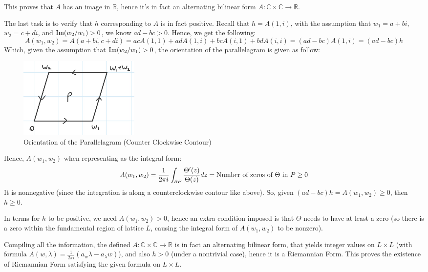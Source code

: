 \documentclass{article}
\begin{document}
\begin{itemize}
    This proves that $A$ has an image in $\mathbb{R}$, hence it's in fact an alternating bilinear form $A:\mathbb{C}\times\mathbb{C}\rightarrow\mathbb{R}$.

    \hfil

    The last task is to verify that $h$ corresponding to $A$ is in fact positive. Recall that $h=A(1,i)$, with the assumption that $w_1=a+bi$, $w_2=c+di$, and $\textmd{Im}(w_2/w_1)>0$, we know $ad-bc > 0$. Hence, we get the following:
    $$A(w_1,w_2) =A(a+bi,c+di) = acA(1,1)+adA(1,i)+bcA(i,1)+bdA(i,i) = (ad-bc)A(1,i) = (ad-bc)h$$
    Which, given the assumption that $\textmd{Im}(w_2/w_1)>0$, the orientation of the parallelagram is given as follow:

    \begin{figure}[h!]
        \begin{center}
            \includegraphics*[width=60mm]{q2 orient 2.jpg}
            \caption{Orientation of the Parallelagram (Counter Clockwise Contour)}
        \end{center}
    \end{figure}

    Hence, $A(w_1,w_2)$ when representing as the integral form:
    $$A(w_1,w_2)=\frac{1}{2\pi i}\int_{\partial P}\frac{\Theta'(z)}{\Theta(z)}dz = \textmd{Number of zeros of }\Theta \textmd{ in } P \geq 0$$
    It is nonnegative (since the integration is along a counterclockwise contour like above). So, given $(ad-bc)h = A(w_1,w_2)\geq 0$, then $h \geq 0$.

    In terms for $h$ to be positive, we need $A(w_1,w_2)>0$, hence an extra condition imposed is that $\Theta$ needs to have at least a zero (so there is a zero within the fundamental region of lattice $L$, causing the integral form of $A(w_1,w_2)$ to be nonzero).

    \hfil

    Compiling all the information, the defined $A:\mathbb{C}\times \mathbb{C}\rightarrow\mathbb{R}$ is in fact an alternating bilinear form, that yields integer values on $L\times L$ (with formula $A(w,\lambda)=\frac{1}{2\pi i}(a_w\lambda-a_\lambda w)$), and also $h>0$ (under a nontrivial case), hence it is a Riemannian Form. This proves the existence of Riemannian Form satisfying the given formula on $L\times L$.
\end{itemize}
\end{document}

